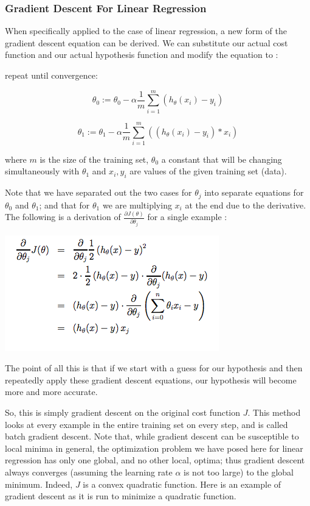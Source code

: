 \documentclass[UTF8]{article}
\begin{document}
\subsubsection{Gradient Descent For Linear Regression}

When specifically applied to the case of linear regression, a new form of the gradient descent equation can be derived. We can substitute our actual cost function and our actual hypothesis function and modify the equation to :

repeat until convergence:

\[ \theta_0 := \theta_0-\alpha \frac{1}{m} \sum\limits_{i=1}^{m}(h_\theta(x_{i}) - y_{i}) \]
 
\[ \theta_1 := \theta_1 - \alpha \frac{1}{m} \sum\limits_{i=1}^{m}((h_\theta(x_{i}) - y_{i}) * x_{i}) \]

where $m$ is the size of the training set, $\theta_0$ a constant that will be changing simultaneously with $\theta_1$ and $x_{i}, y_{i}$ are values of the given training set (data).

Note that we have separated out the two cases for $\theta_j$ into separate equations for $\theta_0$ and $\theta_1$; and that for $\theta_1$ we are multiplying $x_{i}$ at the end due to the derivative. The following is a derivation of $\frac{\partial J(\theta)}{\partial \theta_j}$ for a single example :

\includegraphics[width = \textwidth]{NotePics/2_3_2_1.png}

The point of all this is that if we start with a guess for our hypothesis and then repeatedly apply these gradient descent equations, our hypothesis will become more and more accurate.

So, this is simply gradient descent on the original cost function $J$. This method looks at every example in the entire training set on every step, and is called batch gradient descent. Note that, while gradient descent can be susceptible to local minima in general, the optimization problem we have posed here for linear regression has only one global, and no other local, optima; thus gradient descent always converges (assuming the learning rate $\alpha$ is not too large) to the global minimum. Indeed, $J$ is a convex quadratic function. Here is an example of gradient descent as it is run to minimize a quadratic function.
\end{document}
